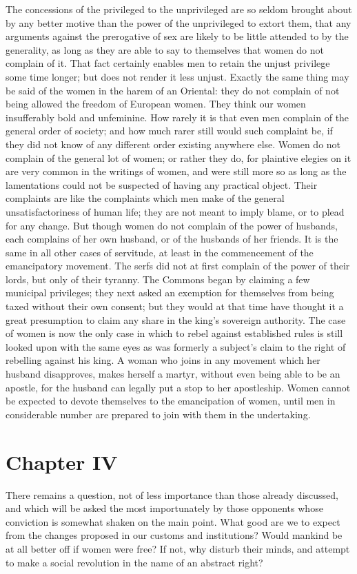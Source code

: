 \documentclass[12pt]{report}
\newcommand{\mychapter}[2]{
\setcounter{chapter}{#1}
    \setcounter{section}{0}
    \chapter*{#2}
    \addcontentsline{toc}{chapter}{#2}
}
\begin{document}
The concessions of the privileged to the unprivileged are so seldom brought about by any better motive than the power of the unprivileged to extort them, that any arguments against the prerogative of sex are likely to be little attended to by the generality, as long as they are able to say to themselves that women do not complain of it. That fact certainly enables men to retain the unjust privilege some time longer; but does not render it less unjust. Exactly the same thing may be said of the women in the harem of an Oriental: they do not complain of not being allowed the freedom of European women. They think our women insufferably bold and unfeminine. How rarely it is that even men complain of the general order of society; and how much rarer still would such complaint be, if they did not know of any different order existing anywhere else. Women do not complain of the general lot of women; or rather they do, for plaintive elegies on it are very common in the writings of women, and were still more so as long as the lamentations could not be suspected of having any practical object. Their complaints are like the complaints which men make of the general unsatisfactoriness of human life; they are not meant to imply blame, or to plead for any change. But though women do not complain of the power of husbands, each complains of her own husband, or of the husbands of her friends. It is the same in all other cases of servitude, at least in the commencement of the emancipatory movement. The serfs did not at first complain of the power of their lords, but only of their tyranny. The Commons began by claiming a few municipal privileges; they next asked an exemption for themselves from being taxed without their own consent; but they would at that time have thought it a great presumption to claim any share in the king's sovereign authority. The case of women is now the only case in which to rebel against established rules is still looked upon with the same eyes as was formerly a subject's claim to the right of rebelling against his king. A woman who joins in any movement which her husband disapproves, makes herself a martyr, without even being able to be an apostle, for the husband can legally put a stop to her apostleship. Women cannot be expected to devote themselves to the emancipation of women, until men in considerable number are prepared to join with them in the undertaking.

\mychapter{4}{Chapter IV}
There remains a question, not of less importance than those already discussed, and which will be asked the most importunately by those opponents whose conviction is somewhat shaken on the main point. What good are we to expect from the changes proposed in our customs and institutions? Would mankind be at all better off if women were free? If not, why disturb their minds, and attempt to make a social revolution in the name of an abstract right?
\end{document}
